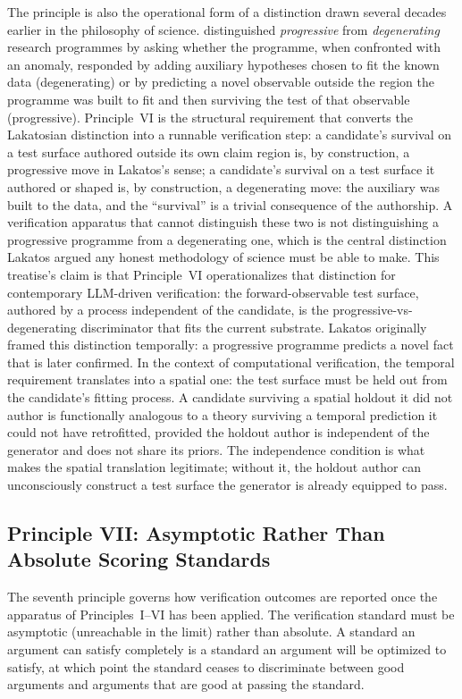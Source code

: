 \documentclass[11pt]{article}
\begin{document}
The principle is also the operational form of a distinction drawn several decades earlier in the philosophy of science. \citet{lakatos1978} distinguished \emph{progressive} from \emph{degenerating} research programmes by asking whether the programme, when confronted with an anomaly, responded by adding auxiliary hypotheses chosen to fit the known data (degenerating) or by predicting a novel observable outside the region the programme was built to fit and then surviving the test of that observable (progressive). Principle~VI is the structural requirement that converts the Lakatosian distinction into a runnable verification step: a candidate's survival on a test surface authored outside its own claim region is, by construction, a progressive move in Lakatos's sense; a candidate's survival on a test surface it authored or shaped is, by construction, a degenerating move: the auxiliary was built to the data, and the ``survival'' is a trivial consequence of the authorship. A verification apparatus that cannot distinguish these two is not distinguishing a progressive programme from a degenerating one, which is the central distinction Lakatos argued any honest methodology of science must be able to make. This treatise's claim is that Principle~VI operationalizes that distinction for contemporary LLM-driven verification: the forward-observable test surface, authored by a process independent of the candidate, is the progressive-vs-degenerating discriminator that fits the current substrate. Lakatos originally framed this distinction temporally: a progressive programme predicts a novel fact that is later confirmed. In the context of computational verification, the temporal requirement translates into a spatial one: the test surface must be held out from the candidate's fitting process. A candidate surviving a spatial holdout it did not author is functionally analogous to a theory surviving a temporal prediction it could not have retrofitted, provided the holdout author is independent of the generator and does not share its priors. The independence condition is what makes the spatial translation legitimate; without it, the holdout author can unconsciously construct a test surface the generator is already equipped to pass.

\subsection{Principle VII: Asymptotic Rather Than Absolute Scoring Standards}

The seventh principle governs how verification outcomes are reported once the apparatus of Principles~I--VI has been applied. The verification standard must be asymptotic (unreachable in the limit) rather than absolute. A standard an argument can satisfy completely is a standard an argument will be optimized to satisfy, at which point the standard ceases to discriminate between good arguments and arguments that are good at passing the standard.
\end{document}
